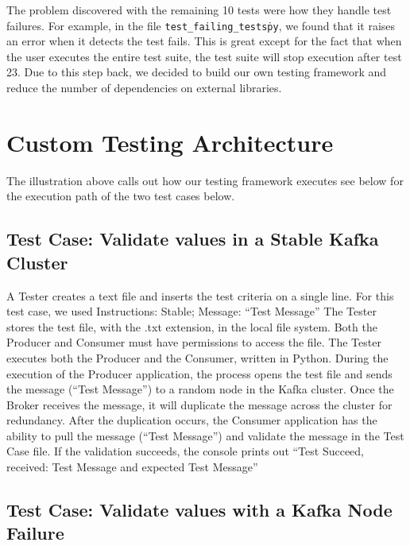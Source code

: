 \begin{multicols}{2}
The problem discovered with the remaining 10 tests were how they handle test failures.
For example, in the file \texttt{test\_failing\_tests\.py}, we found that it raises an error when it detects the test fails.
This is great except for the fact that when the user executes the entire test suite, the test suite will stop execution after test 23.
Due to this step back, we decided to build our own testing framework and reduce the number of dependencies on external libraries.

\section{Custom Testing Architecture}

\vspace{1em}
\vspace{1em}

The illustration above calls out how our testing framework executes see below for the execution path of the two test cases below.

\subsection{Test Case: Validate values in a Stable Kafka Cluster}

A Tester creates a text file and inserts the test criteria on a single line.
For this test case, we used Instructions: Stable; Message: “Test Message”
The Tester stores the test file, with the .txt extension, in the local file system.
Both the Producer and Consumer must have permissions to access the file.
The Tester executes both the Producer and the Consumer, written in Python.
During the execution of the Producer application, the process opens the test file and sends the message (“Test Message”) to a random node in the Kafka cluster.
Once the Broker receives the message, it will duplicate the message across the cluster for redundancy.
After the duplication occurs, the Consumer application has the ability to pull the message (“Test Message”) and validate the message in the Test Case file.
If the validation succeeds, the console prints out “Test Succeed, received: Test Message and expected Test Message”

\subsection{Test Case: Validate values with a Kafka Node Failure}


\end{multicols}
